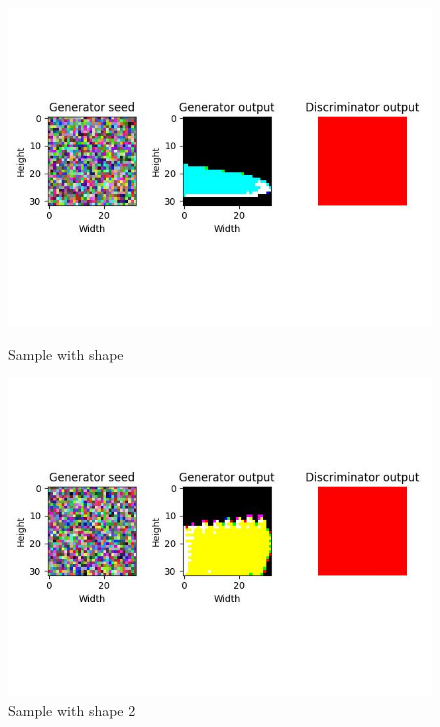 \documentclass[conference]{IEEEtran}
\begin{document}
\begin{figure}[!h]
    \centering
    \includegraphics[scale=0.15]{images/sample with shape.jpg}
    \caption{Sample with shape} \label{sample with shape}
    \centering
    \includegraphics[scale=0.15]{images/sample with shape 2.jpg}
    \caption{Sample with shape 2} \label{sample with shape 2}
\end{figure}
\end{document}
